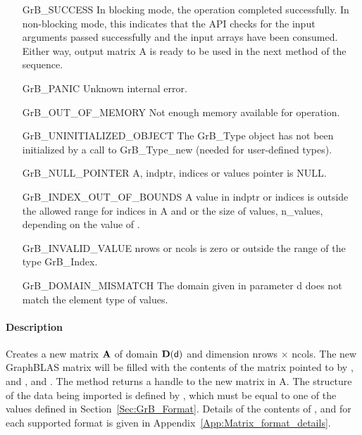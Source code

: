 \begin{itemize}[leftmargin=2.3in]
    \item[{\sf GrB\_SUCCESS}]         In blocking mode, the operation completed
    successfully. In non-blocking mode, this indicates that the API checks 
    for the input arguments passed successfully and the input arrays have been consumed. 
    Either way, output matrix {\sf A} is ready to be used in the next method of the sequence.

    \item[{\sf GrB\_PANIC}]           Unknown internal error.
    
    \item[{\sf GrB\_OUT\_OF\_MEMORY}] Not enough memory available for operation.
    
    \item[{\sf GrB\_UNINITIALIZED\_OBJECT}]  The {\sf GrB\_Type} object has not 
    been initialized by a call to {\sf GrB\_Type\_new} (needed for user-defined types).
    
    \item[{\sf GrB\_NULL\_POINTER}]  {\sf A}, {\sf indptr}, 
    {\sf indices} or {\sf values} pointer is {\sf NULL}.

    \item[{\sf GrB\_INDEX\_OUT\_OF\_BOUNDS}] A value in {\sf indptr} or
    {\sf indices} is outside the allowed range for indices in {\sf A} and or 
    the size of values, {\sf n\_values}, depending on the value of .

    \item[{\sf GrB\_INVALID\_VALUE}] {\sf nrows} or {\sf ncols} is zero or 
    outside the range of the type {\sf GrB\_Index}.
    
    \item[{\sf GrB\_DOMAIN\_MISMATCH}]  The domain given in parameter {\sf d} does
    not match the element type of {\sf values}.
\end{itemize}

\paragraph{Description}

Creates a new matrix ${\bf A}$ of domain $\mathbf{D}({\sf d})$ and dimension
{\sf nrows $\times$ ncols}. The new GraphBLAS matrix will be filled with the
contents of the matrix pointed to by , and , and .
The method returns a handle to the new matrix in {\sf A}.  The structure of
the data being imported is defined by , which must be equal to
one of the values defined in Section~\ref{Sec:GrB_Format}.  Details of the contents
of ,  and  for each supported format is given in 
Appendix~\ref{App:Matrix_format_details}.

